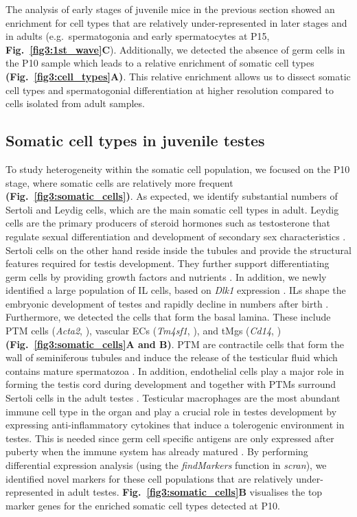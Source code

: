 The analysis of early stages of juvenile mice in the previous section showed an enrichment for cell types that are relatively under-represented in later stages and in adults (e.g.~spermatogonia and early spermatocytes at P15, \textbf{Fig.~\ref{fig3:1st_wave}C}). 
Additionally, we detected the absence of germ cells in the P10 sample which leads to a relative enrichment of somatic cell types \textbf{(Fig.~\ref{fig3:cell_types}A)}. 
This relative enrichment allows us to dissect somatic cell types and spermatogonial differentiation at higher resolution compared to cells isolated from adult samples.

\subsection{Somatic cell types in juvenile testes}

To study heterogeneity within the somatic cell population, we focused on the P10 stage, where somatic cells are relatively more frequent \textbf{(Fig.~\ref{fig3:somatic_cells})}. 
As expected, we identify substantial numbers of Sertoli and Leydig cells, which are the main somatic cell types in adult. 
Leydig cells are the primary producers of steroid hormones such as testosterone that regulate sexual differentiation and development of secondary sex characteristics \citep{Svechnikov2010, Haider2004}. 
Sertoli cells on the other hand reside inside the tubules and provide the structural features required for testis development. 
They further support differentiating germ cells by providing growth factors and nutrients  \citep{Griswold1998}. 
In addition, we newly identified a large population of \gls{IL} cells, based on \textit{Dlk1} expression \citep{Lottrup2014}. 
ILs shape the embryonic development of testes and rapidly decline in numbers after birth \citep{Griswold2009}. \\

Furthermore, we detected the cells that form the basal lamina. 
These include \gls{PTM} cells (\textit{Acta2}, \citep{Cool2008}), vascular \glspl{EC} (\textit{Tm4sf1}, \citep{Shih2009}), and \glspl{tMg} (\textit{Cd14}, \citep{Kitchens2000}) \textbf{(Fig.~\ref{fig3:somatic_cells}A and B)}. 
PTM are contractile cells that form the wall of seminiferous tubules and induce the release of the testicular fluid which contains mature spermatozoa \citep{Diez-Torre2011}. 
In addition, endothelial cells play a major role in forming the testis cord during development and together with PTMs surround Sertoli cells in the adult testes \citep{Combes2009}. 
Testicular macrophages are the most abundant immune cell type in the organ and play a crucial role in testes development by expressing anti-inflammatory cytokines that induce a tolerogenic environment in testes. 
This is needed since germ cell specific antigens are only expressed after puberty when the immune system has already matured \citep{Fijak2006}. 
By performing differential expression analysis (using the \emph{findMarkers} function in \emph{scran}), we identified novel markers for these cell populations that are relatively under-represented in adult testes. 
\textbf{Fig.~\ref{fig3:somatic_cells}B} visualises the top marker genes for the enriched somatic cell types detected at P10.\\

